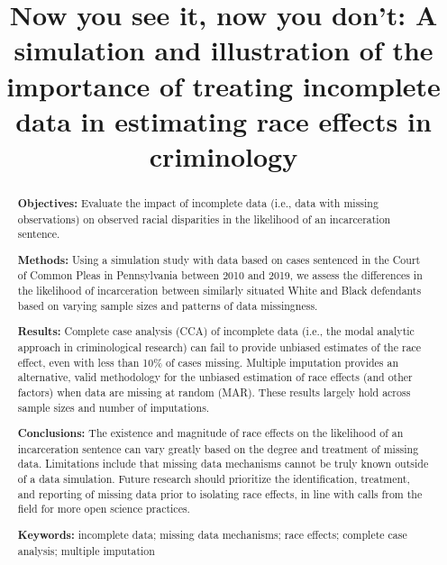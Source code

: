 \documentclass[titlepage]{article}
\title{Now you see it, now you don't: A simulation and illustration of the importance of treating incomplete data in estimating race effects in criminology}
\author{}
\date{} %
\renewcommand{\thefootnote}{\fnsymbol{footnote}}
\begin{document}
\pagestyle{fancy}
\fancyhf{}
\fancyfoot[R]{\thepage}

\maketitle

\renewcommand{\thefootnote}{\arabic{footnote}}

\newpage

\begin{abstract} 
\noindent \textbf{Objectives:} Evaluate the impact of incomplete data (i.e., data with missing observations) on observed racial disparities in the likelihood of an incarceration sentence.

\noindent \textbf{Methods:} Using a simulation study with data based on cases sentenced in the Court of Common Pleas in Pennsylvania between 2010 and 2019, we assess the differences in the likelihood of incarceration between similarly situated White and Black defendants based on varying sample sizes and patterns of data missingness.

\noindent \textbf{Results:} Complete case analysis (CCA) of incomplete data (i.e., the modal analytic approach in criminological research) can fail to provide unbiased estimates of the race effect, even with less than 10\% of cases missing. Multiple imputation provides an alternative, valid methodology for the unbiased estimation of race effects (and other factors) when data are missing at random (MAR). These results largely hold across sample sizes and number of imputations.

\noindent \textbf{Conclusions:} The existence and magnitude of race effects on the likelihood of an incarceration sentence can vary greatly based on the degree and treatment of missing data. Limitations include that missing data mechanisms cannot be truly known outside of a data simulation. Future research should prioritize the identification, treatment, and reporting of missing data prior to isolating race effects, in line with calls from the field for more open science practices.

\noindent \textbf{Keywords:} incomplete data; missing data mechanisms; race effects; complete case analysis; multiple imputation 
 \end{abstract}



\end{document}
